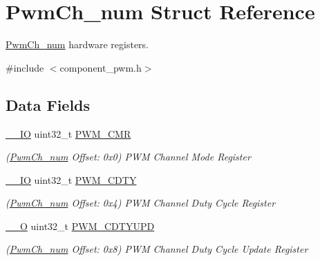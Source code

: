 \hypertarget{structPwmCh__num}{}\section{Pwm\+Ch\+\_\+num Struct Reference}
\label{structPwmCh__num}


\mbox{\hyperlink{structPwmCh__num}{Pwm\+Ch\+\_\+num}} hardware registers.  




{\ttfamily \#include $<$component\+\_\+pwm.\+h$>$}

\subsection*{Data Fields}
\begin{DoxyCompactItemize}
\item 
\mbox{\label{structPwmCh__num_a6214028091bb04f2fae21b10c204eac7}} 
\mbox{\hyperlink{core__cm7_8h_aec43007d9998a0a0e01faede4133d6be}{\+\_\+\+\_\+\+IO}} uint32\+\_\+t \mbox{\hyperlink{structPwmCh__num_a6214028091bb04f2fae21b10c204eac7}{P\+W\+M\+\_\+\+C\+MR}}
\begin{DoxyCompactList}\small\item\em (\mbox{\hyperlink{structPwmCh__num}{Pwm\+Ch\+\_\+num}} Offset\+: 0x0) P\+WM Channel Mode Register \end{DoxyCompactList}\item 
\mbox{\label{structPwmCh__num_aace480403c8aaff5871ba2e4dd486272}} 
\mbox{\hyperlink{core__cm7_8h_aec43007d9998a0a0e01faede4133d6be}{\+\_\+\+\_\+\+IO}} uint32\+\_\+t \mbox{\hyperlink{structPwmCh__num_aace480403c8aaff5871ba2e4dd486272}{P\+W\+M\+\_\+\+C\+D\+TY}}
\begin{DoxyCompactList}\small\item\em (\mbox{\hyperlink{structPwmCh__num}{Pwm\+Ch\+\_\+num}} Offset\+: 0x4) P\+WM Channel Duty Cycle Register \end{DoxyCompactList}\item 
\mbox{\label{structPwmCh__num_a9a1b5f6fef4c3dd45167a1c048022cdd}} 
\mbox{\hyperlink{core__cm7_8h_a7e25d9380f9ef903923964322e71f2f6}{\+\_\+\+\_\+O}} uint32\+\_\+t \mbox{\hyperlink{structPwmCh__num_a9a1b5f6fef4c3dd45167a1c048022cdd}{P\+W\+M\+\_\+\+C\+D\+T\+Y\+U\+PD}}
\begin{DoxyCompactList}\small\item\em (\mbox{\hyperlink{structPwmCh__num}{Pwm\+Ch\+\_\+num}} Offset\+: 0x8) P\+WM Channel Duty Cycle Update Register \end{DoxyCompactList}\item 

\end{DoxyCompactItemize}
